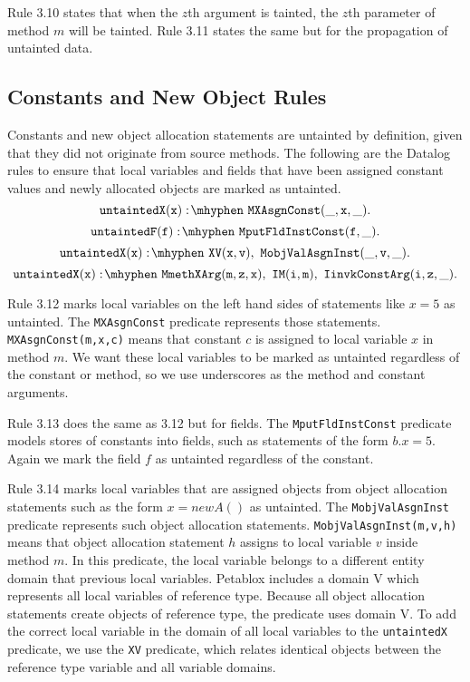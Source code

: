 Rule 3.10 states that when the $z$th argument is tainted, the $z$th parameter of method $m$ will be tainted. Rule 3.11 states the same but for the propagation of untainted data.
\subsection{Constants and New Object Rules}
Constants and new object allocation statements are untainted by definition, given that they did not originate from source methods. The following are the Datalog rules to ensure that local variables and fields that have been assigned constant values and newly allocated objects are marked as untainted.
\begin{equation}
  \mathtt{untaintedX(x) \is MXAsgnConst(\_,x,\_).}
\end{equation}
\begin{equation}
  \mathtt{untaintedF(f) \is MputFldInstConst(f,\_).}
\end{equation}
\begin{equation}
  \mathtt{untaintedX(x) \is XV(x,v) \also MobjValAsgnInst(\_,v,\_).}
\end{equation}
\begin{equation}
  \mathtt{untaintedX(x) \is MmethXArg(m,z,x) \also IM(i,m) \also IinvkConstArg(i,z,\_).}
\end{equation}

Rule 3.12 marks local variables on the left hand sides of statements like $x = 5$ as untainted. The \texttt{MXAsgnConst} predicate represents those statements. \texttt{MXAsgnConst(m,x,c)} means that constant $c$ is assigned to local variable $x$ in method $m$. We want these local variables to be marked as untainted regardless of the constant or method, so we use underscores as the method and constant arguments.

Rule 3.13 does the same as 3.12 but for fields. The \texttt{MputFldInstConst} predicate models stores of constants into fields, such as statements of the form $b.x = 5$. Again we mark the field $f$ as untainted regardless of the constant.

Rule 3.14 marks local variables that are assigned objects from object allocation statements such as the form $x = new A()$ as untainted. The \texttt{MobjValAsgnInst} predicate represents such object allocation statements. \texttt{MobjValAsgnInst(m,v,h)} means that object allocation statement $h$ assigns to local variable $v$ inside method $m$. In this predicate, the local variable belongs to a different entity domain that previous local variables. Petablox includes a domain V which represents all local variables of reference type. Because all object allocation statements create objects of reference type, the predicate uses domain V. To add the correct local variable in the domain of all local variables to the \texttt{untaintedX} predicate, we use the \texttt{XV} predicate, which relates identical objects between the reference type variable and all variable domains.

